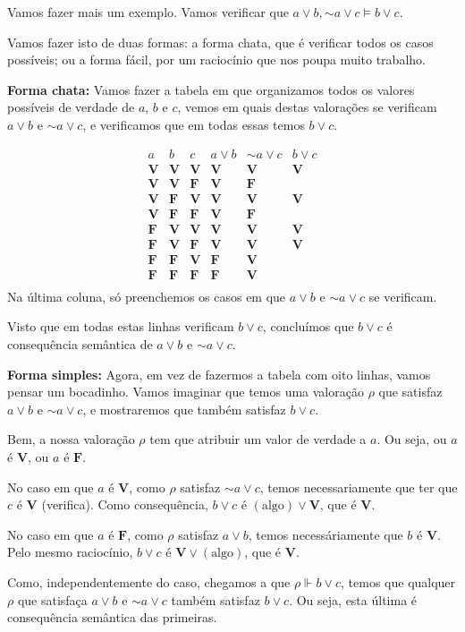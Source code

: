 \documentclass{article}
\theoremstyle{definition}
\theoremstyle{remark}
\newcommand{\V}{\mathbf{V}}
\newcommand{\F}{\mathbf{F}}
\newcommand*{\lneg}{\mathord{\sim}}
\begin{document}
	Vamos fazer mais um exemplo. Vamos verificar que $a \lor b, \lneg a \lor c \vDash b \lor c$.
	
	Vamos fazer isto de duas formas: a forma chata, que é verificar todos os casos possíveis; ou a forma fácil, por um raciocínio que nos poupa muito trabalho.
	
	\textbf{Forma chata:} Vamos fazer a tabela em que organizamos todos os valores possíveis de verdade de $a$, $b$ e $c$, vemos em quais destas valorações se verificam $a \lor b$ e $\lneg a \lor c$, e verificamos que em todas essas temos $b \lor c$.
	
	\[
	\begin{array}{c|c|c|c|c|c}
	a&b&c&a\lor b&\lneg a \lor c& b \lor c\\
	\hline
	\V&\V&\V&\V&\V&\V\\
	\V&\V&\F&\V&\F&\\
	\V&\F&\V&\V&\V&\V\\
	\V&\F&\F&\V&\F&\\
	\F&\V&\V&\V&\V&\V\\
	\F&\V&\F&\V&\V&\V\\
	\F&\F&\V&\F&\V&\\
	\F&\F&\F&\F&\V&\\
	\end{array}
	\]
	Na última coluna, só preenchemos os casos em que $a\lor b$ e $\lneg a \lor c$ se verificam.
	
	Visto que em todas estas linhas verificam $b \lor c$, concluímos que $b \lor c$ é consequência semântica de $a\lor b$ e $\lneg a \lor c$.
	
	\medskip
	
	\textbf{Forma simples:} Agora, em vez de fazermos a tabela com oito linhas, vamos pensar um bocadinho. Vamos imaginar que temos uma valoração $\rho$ que satisfaz $a\lor b$ e $\lneg a \lor c$, e mostraremos que também satisfaz $b \lor c$.
	
	Bem, a nossa valoração $\rho$ tem que atribuir um valor de verdade a $a$. Ou seja, ou $a$ é $\V$, ou $a$ é $\F$.
	
	No caso em que $a$ é $\V$, como $\rho$ satisfaz $\lneg a \lor c$, temos necessariamente que ter que $c$ é $\V$ (verifica). Como consequência, $b \lor c$ é $(\text{algo}) \lor \V$, que é $\V$.
	
	No caso em que $a$ é $\F$, como $\rho$ satisfaz $a \lor b$, temos necessáriamente que $b$ é $\V$. Pelo mesmo raciocínio, $b \lor c$ é $\V \lor (\text{algo})$, que é $\V$.
	
	Como, independentemente do caso, chegamos a que $\rho \Vdash b \lor c$, temos que qualquer $\rho$ que satisfaça $a\lor b$ e $\lneg a \lor c$ também satisfaz $b \lor c$. Ou seja, esta última é consequência semântica das primeiras.
	
\end{document}
